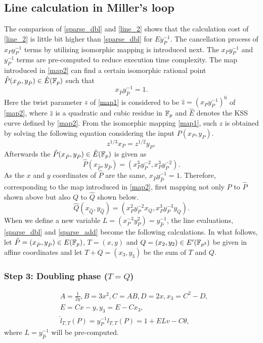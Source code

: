 \subsection{Line calculation in Miller's loop}
The comparison of \eqref{sparse_dbl} and \eqref{line_2} shows that the calculation cost of \eqref{line_2} is little bit higher than \eqref{sparse_dbl} for $Ey_P^{-1}$. The  cancellation process of $x_Py_P^{-1}$ terms by utilizing isomorphic mapping is introduced next. The $x_Py_P^{-1}$ and $y_P^{-1}$ terms are pre-computed to reduce execution time complexity.
The map introduced in \eqref{map2} can find a certain isomorphic rational point $\hat{P}(x_{\hat{P}},y_{\hat{P}})\in \hat{E}({\mathbb{F}}_{p})$ such that
\begin{equation}
	x_{\hat{P}}y_{\hat{P}}^{-1}=1.
\end{equation}
Here the twist parameter $z$ of  \eqref{map1} is considered to be $\hat{z}=(x_Py_P^{-1})^6$ of \eqref{map2}, where $\hat{z}$ is a quadratic and cubic residue in ${\mathbb{F}}_{p}$ and $\hat{E}$ denotes the KSS curve defined by  \eqref{map2}. From the isomorphic mapping \eqref{map1}, such $z$ is obtained by solving the following equation considering the input $P(x_P,y_P)$.
\begin{equation}
	z^{1/3}x_P=z^{1/2}y_P,
\end{equation}
Afterwards the $\hat{P}(x_{\hat{P}},y_{\hat{P}})\in \hat{E}({\mathbb{F}}_{p})$ is given as
\begin{equation}
	\hat{P}(x_{\hat{P}},y_{\hat{P}})=(x_P^3y_P^{-2},x_P^3y_P^{-2}).
\end{equation}
As the $x$ and $y$ coordinates of $\hat{P}$ are the same, $x_{\hat{P}}y_{\hat{P}}^{-1}=1$. Therefore, corresponding to the map introduced in \eqref{map2}, first mapping not only $P$ to $\hat{P}$ shown above but also $Q$ to $\hat{Q}$ shown below.
\begin{equation}
	\hat{Q}(x_{\hat{Q}},y_{\hat{Q}})=(x_P^2y_P^{-2}x_Q,x_P^3y_P^{-3}y_Q).
\end{equation}
When we define a new variable $L=(x_P^{-3}y_P^2)=y_{\hat{P}}^{-1}$, the line evaluations, \eqref{sparse_dbl} and \eqref{sparse_add} become the following calculations.
In what follows, let $\hat{P}=(x_{\hat{P}},y_{\hat{P}})\in E({\mathbb{F}}_{p})$, $T=(x,y)$ and $Q=(x_2,y_2)\in E'(\mathbb{F}_{p^{3}})$ be given in affine coordinates and let $T+Q=(x_3,y_3)$ be the sum of $T$ and $Q$.
\subsubsection{Step 3: Doubling phase \texorpdfstring{($T=Q$)}{}}
\begin{eqnarray}
&A=\frac{1}{2y}, B=3x^2, C=AB, D=2x, x_3=C^2-D,\nonumber\\
&E=Cx-y, y_3=E-Cx_3,\nonumber\\
&\hat{l}_{T,T}(P) = y^{-1}_Pl_{T,T}(P)=1+ELv-C\theta,\label{pseudo_dbl}
\end{eqnarray}
where $L=y_{\hat{P}}^{-1}$ will be pre-computed.
